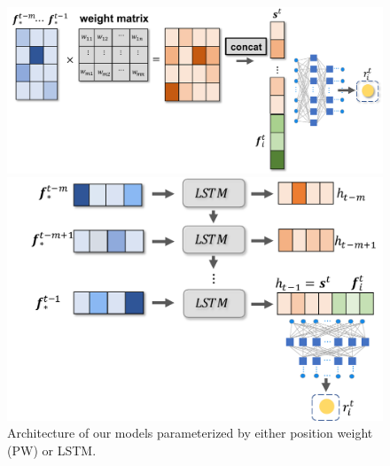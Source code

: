 \documentclass{article} %
\begin{document}
\begin{figure}[htbp]
    \vspace{-2.5mm}
  \begin{minipage}[c]{0.50\textwidth}
    \centering
    \includegraphics[width=\textwidth]{Figs/PABOW.pdf}
  \end{minipage}
  \begin{minipage}[c]{0.40\textwidth}
    \centering
    \includegraphics[width=\textwidth]{Figs/LSTM.pdf}
  \end{minipage}\hfill
    \vspace{-2.5mm}
  \caption{\footnotesize Architecture of our models parameterized by either position weight ({\small PW}) or {\small LSTM}. 
    }
    \label{fg:usermodel}
    \vspace{-4mm}
\end{figure}
\end{document}
